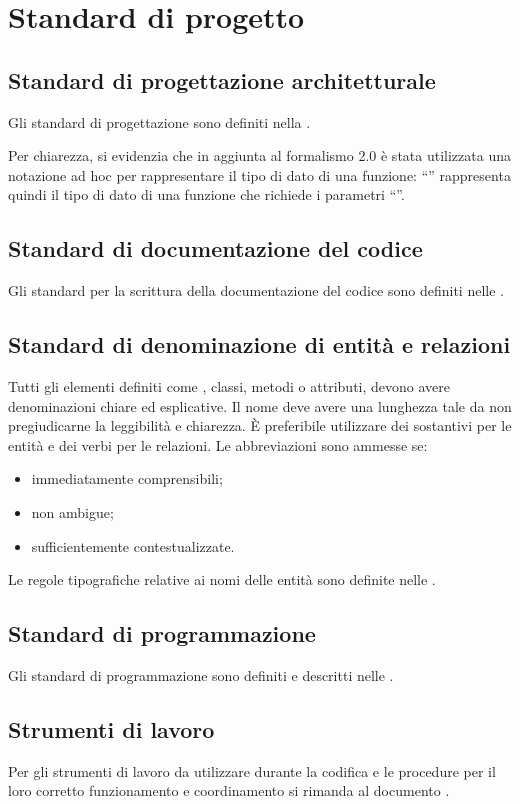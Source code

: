 \section{Standard di progetto}

\subsection{Standard di progettazione architetturale}
Gli standard di progettazione sono definiti nella \SpecificaTecnica{}.

Per chiarezza, si evidenzia che in aggiunta al formalismo  2.0 è stata utilizzata una notazione ad hoc per rappresentare il tipo di dato di una funzione: ``'' rappresenta quindi il tipo di dato di una funzione che richiede i parametri ``''.

\subsection{Standard di documentazione del codice}
Gli standard per la scrittura della documentazione del codice sono definiti nelle \NormeDiProgetto{}.

\subsection{Standard di denominazione di entità e relazioni}
Tutti gli elementi definiti come , classi, metodi o attributi, devono avere denominazioni chiare ed esplicative. Il nome deve avere una lunghezza tale da non pregiudicarne la leggibilità e chiarezza. \`E preferibile utilizzare dei sostantivi per le entità e dei verbi per le relazioni. Le abbreviazioni sono ammesse se:
\begin{itemize}
	\item immediatamente comprensibili; 
	\item non ambigue;
	\item sufficientemente contestualizzate.
\end{itemize}

Le regole tipografiche relative ai nomi delle entità sono definite nelle \NormeDiProgetto{}.

\subsection{Standard di programmazione}
Gli standard di programmazione sono definiti e descritti nelle \NormeDiProgetto{}.

\subsection{Strumenti di lavoro}
Per gli strumenti di lavoro da utilizzare durante la codifica e le procedure per il loro corretto funzionamento e coordinamento si rimanda al documento \NormeDiProgetto{}.
